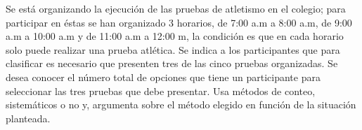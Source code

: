 \ejemplo

Se está organizando la ejecución de las pruebas de atletismo en el colegio; para participar en éstas se han organizado 3 horarios, de 7:00 a.m a 8:00 a.m, de 9:00 a.m a 10:00 a.m y de 11:00 a.m a 12:00 m, la condición es que en cada horario solo puede realizar una prueba atlética. Se indica a los participantes que para clasificar es necesario que presenten tres de las cinco pruebas organizadas. Se desea conocer el número total de opciones que tiene un participante para seleccionar las tres pruebas que debe presentar. Usa métodos de conteo, sistemáticos o no y, argumenta sobre el método elegido en función de la situación planteada.

